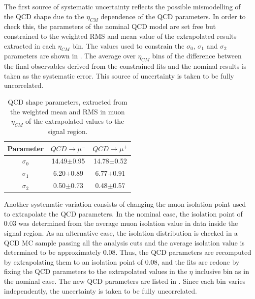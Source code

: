 The first source of systematic uncertainty reflects the possible mismodelling of the QCD shape due to the $\eta_{CM}$ dependence of the QCD parameters. In order to check this, the parameters of the nominal QCD model are set free but constrained to the weighted RMS and mean value of the extrapolated results extracted in each $\eta_{CM}$ bin. The values used to constrain the $\sigma_{0}$,  $\sigma_{1}$ and  $\sigma_{2}$ parameters are shown in . The average over $\eta_{CM}$ bins of the difference between the final observables derived from the constrained fits and the nominal results is taken as the systematic error. This source of uncertainty is taken to be fully uncorrelated.

\begin{table}[!h]
  \begin{center}
  \begin{tabular}{|c|c|c|}\hline
  Parameter & $QCD \to \mu^{-}$ & $QCD \to \mu^{+}$ \\\hline
  $\sigma_{0}$ & 14.49$\pm$0.95 & 14.78$\pm$0.52 \\\hline
  $\sigma_{1}$ & 6.20$\pm$0.89 & 6.77$\pm$0.91\\\hline
  $\sigma_{2}$ & 0.50$\pm$0.73 & 0.48$\pm$0.57\\\hline
  \end{tabular}
  \end{center}
  \caption{QCD shape parameters, extracted from the weighted mean and RMS in muon $\eta_{CM}$ of the extrapolated values to the signal region.}
  \label{tab:QCDContrainPar}
\end{table}

Another systematic variation consists of changing the muon isolation point used to extrapolate the QCD parameters. In the nominal case, the isolation point of 0.03 was determined from the average muon isolation value in data inside the signal region. As an alternative case, the isolation distribution is checked in a QCD \PYTHIA MC sample passing all the analysis cuts and the average isolation value is  determined to be approximately 0.08. Thus, the QCD parameters are recomputed by extrapolating them to an isolation point of 0.08, and the fits are redone by fixing the QCD parameters to the extrapolated values in the $\eta$ inclusive bin as in the nominal case. The new QCD parameters are listed in . Since each bin varies independently, the uncertainty is taken to be fully uncorrelated.

